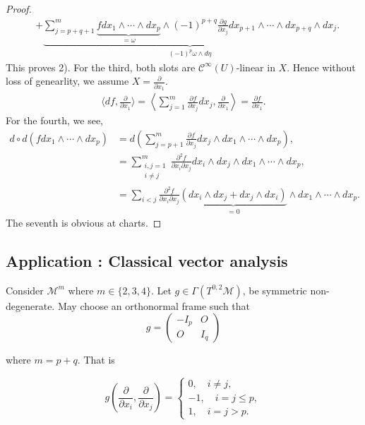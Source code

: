 \documentclass[10pt]{article}
\newcommand{\M}[0]{\mathcal{M}}
\newcommand{\cinf}[0]{\mathcal{C}^\infty}
\newcommand{\pd}[2]{{\frac {\partial #1} {\partial #2}}}
\begin{document}
\begin{proof}
\begin{align*}
  & + \underbrace{\sum_{j=p+q+1}^m \underbrace{fdx_1\wedge\cdots \wedge dx_p}_{=\omega}\wedge (-1)^{p+q}\pd{g}{x_j}dx_{p+1}\wedge\cdots\wedge dx_{p+q}\wedge dx_j}_{(-1)^p\omega\wedge d\eta}. 
\end{align*}
This proves 2). For the third, both slots are $\cinf(U)$-linear in $X$. Hence without loss of genearlity, we assume $X = \pd{}{x_1}$.
\begin{align*}
  \langle df,\pd{}{x_1}\rangle = \left\langle\sum_{j=1}^m\pd{f}{x_j}dx_j,\pd{}{x_1}\right\rangle = \pd{f}{x_1}.
\end{align*}
For the fourth, we see,
\begin{align*}
  d\circ d (fdx_1\wedge\cdots\wedge dx_p) & = d\left(\sum_{j=p+1}^m\pd{f}{x_j}dx_j\wedge dx_1\wedge\cdots\wedge dx_p\right),\\
  & = \sum_{\substack{i,j=1\\ i\not=j}}^m {\frac {\partial^2 f}{\partial x_i\partial x_j}}dx_i\wedge dx_j\wedge dx_1\wedge\cdots\wedge dx_{p},\\
  & = \sum_{i<j}{\frac {\partial^2 f} {\partial x_i\partial x_j}}\underbrace{(dx_i\wedge dx_j+dx_j\wedge dx_i)}_{=0}\wedge dx_1\wedge\cdots\wedge dx_p.
\end{align*}
The seventh is obvious at charts.
\end{proof}

\subsection{Application : Classical vector analysis}
Consider $\M^m$ where $m\in\{2,3,4\}$. Let $g\in\Gamma(T^{0,2}\M)$, be symmetric non-degenerate. May choose an orthonormal frame such that 
\begin{equation*}
  g = \begin{pmatrix}
    -I_p & O\\
    O & I_q
  \end{pmatrix}
\end{equation*}

where $m=p+q$. That is 

\begin{equation*}
  g\left(\pd{}{x_i},\pd{}{x_j}\right) =
  \begin{cases}
    0,\quad i\not=j,\\
    -1,\quad i=j\leq p,\\
    1, \quad i=j>p.
  \end{cases}
\end{equation*}
\end{document}
